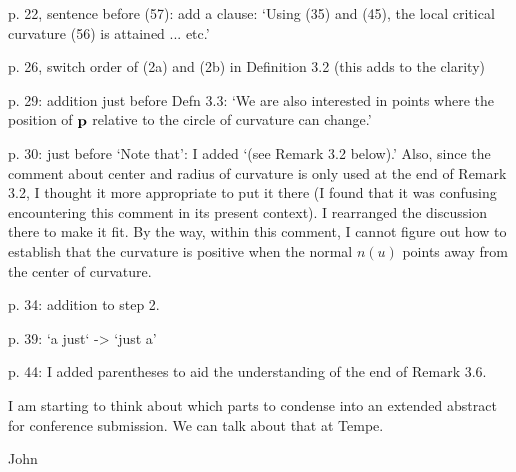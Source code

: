 p. 22, sentence before (57): add a clause:
	`Using (35) and (45), the local critical curvature (56) 
		is attained ... etc.'

p. 26, switch order of (2a) and (2b) in Definition 3.2
	(this adds to the clarity)

p. 29: addition just before Defn 3.3: 
	`We are also interested in points where the position of ${\bf p}$
	 relative to the circle of curvature can change.'

p. 30: just before `Note that': I added `(see Remark 3.2 below).'
	Also, since the comment about center and radius of curvature is
	only used at the end of Remark 3.2, I thought it more appropriate
	to put it there (I found that it was confusing encountering this
	comment in its present context).
	I rearranged the discussion there to make it fit.
	By the way, within this comment, I cannot figure out how to establish
	that the curvature is positive when the normal $n(u)$ points away from
	the center of curvature.

p. 34: addition to step 2.

p. 39: `a just` -> `just a'

p. 44: I added parentheses to aid the understanding of the end of Remark 3.6.



I am starting to think about which parts to condense into an extended
abstract for conference submission.  We can talk about that at Tempe.

					John